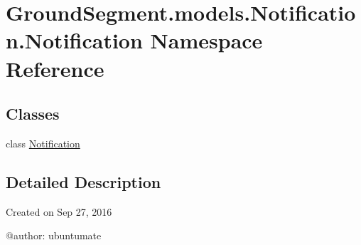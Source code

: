 \hypertarget{namespace_ground_segment_1_1models_1_1_notification_1_1_notification}{}\section{Ground\+Segment.\+models.\+Notification.\+Notification Namespace Reference}
\label{namespace_ground_segment_1_1models_1_1_notification_1_1_notification}
\subsection*{Classes}
\begin{DoxyCompactItemize}
\item 
class \hyperlink{class_ground_segment_1_1models_1_1_notification_1_1_notification_1_1_notification}{Notification}
\end{DoxyCompactItemize}


\subsection{Detailed Description}
\begin{DoxyVerb}Created on Sep 27, 2016

@author: ubuntumate
\end{DoxyVerb}
 